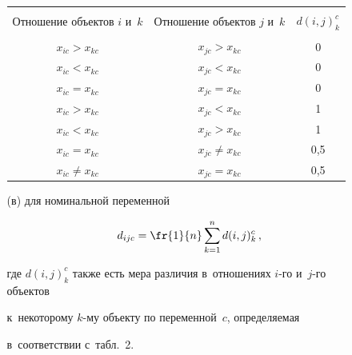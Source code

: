 \begin{itemize}
\begin{itemize}
\begin{table}\small %


\begin{center}




\vspace*{2ex}





\tabcolsep=8.1pt


\begin{tabular}{|c|c|c|}


\hline


&&\\[-9pt]


Отношение объектов $i$ и~$k$&Отношение объектов $j$ и~$k$&$d(i,j)_k^c$\\[2pt]


\hline


&&\\[-9pt]


$x_{ic} > x_{kc}$&$x_{jc} > x_{kc}$&0\hphantom{,9}\\


$x_{ic} < x_{kc}$&$x_{jc} < x_{kc}$&0\hphantom{,9}\\


$x_{ic} = x_{kc}$&$x_{jc} = x_{kc}$&0\hphantom{,9}\\


$x_{ic} > x_{kc}$&$x_{jc} < x_{kc}$&1\hphantom{,9}\\


$x_{ic} < x_{kc}$&$x_{jc} > x_{kc}$&1\hphantom{,9}\\


$x_{ic} = x_{kc}$&$x_{jc} \not= x_{kc}$&0,5\\


$x_{ic} \not= x_{kc}$&$x_{jc} = x_{kc}$&0,5\\[2pt]


\hline


\end{tabular}


\end{center}


\vspace*{-12pt}


\end{table}


  \item[(в)] для номинальной переменной 


  $$


  d_{ijc}=\fr{1}{n}\sum\limits^n_{k=1} d(i,j)_k^c\,,


  $$


где $d(i,j)^c_k$ также есть мера различия в~отношениях $i$-го и~$j$-го объектов 


к~некоторому $k$-му объекту по переменной~$c$, определяемая 


в~соответствии с~табл.~2.


\end{itemize}


\end{itemize}
